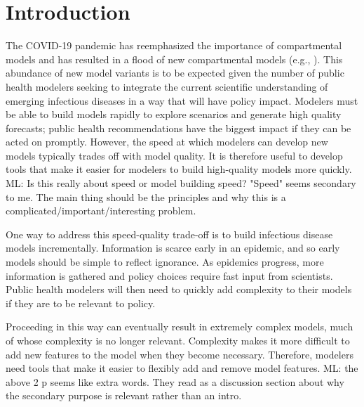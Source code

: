 \documentclass[pdflatex,sn-basic]{sn-jnl}%
\theoremstyle{definition}
\newcommand{\mli}[1]{{\color{purple} ML: #1}}
\begin{document}


\maketitle

\section{Introduction}\label{intro}
The COVID-19 pandemic has reemphasized the importance of compartmental models \citep{abou2020compartmental, massonis2021structural, adam2020special, currie2020simulation, lofgren2014mathematical, mcbryde2020role, enserink2020covid} and has resulted in a flood of new compartmental models (e.g., \cite{friston2020dynamic, fields2021age, chang2022stochastic, lavielle2020extension, balabdaoui2020age, leontitsis2021seahir, LeviEarn22}). 
This abundance of new model variants is to be expected given the number of public health modelers seeking to integrate the current scientific understanding of emerging infectious diseases in a way that will have policy impact. Modelers must be able to build models rapidly to explore scenarios and generate high quality forecasts; public health recommendations have the biggest impact if they can be acted on promptly. However, the speed at which modelers can develop new models typically trades off with model quality. It is therefore useful to develop tools that make it easier for modelers to build high-quality models more quickly. \mli{Is this really about speed or model building speed? "Speed" seems secondary to me. The main thing should be the principles and why this is a complicated/important/interesting problem.}

One way to address this speed-quality trade-off is to build infectious disease models incrementally. Information is scarce early in an epidemic, and so early models should be simple to reflect ignorance. As epidemics progress, more information is gathered and policy choices require fast input from scientists. Public health modelers will then need to quickly add complexity to their models if they are to be relevant to policy. 

Proceeding in this way can eventually result in extremely complex models, much of whose complexity is no longer relevant. Complexity makes it more difficult to add new features to the model when they become necessary. Therefore, modelers need tools that make it easier to flexibly add and remove model features. \mli{the above 2 p seems like extra words. They read as a discussion section about why the secondary purpose is relevant rather than an intro.}
\end{document}
